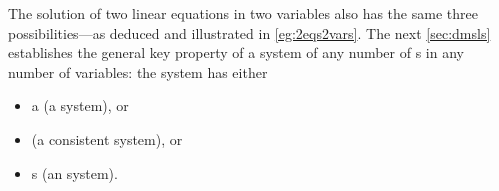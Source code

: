 The solution of two linear equations in two variables also has the same three possibilities---as deduced and illustrated in \autoref{eg:2eqs2vars}.
The next \cref{sec:dmsls} establishes the general key property of a system of any number of s in any number of variables: the system has either
\begin{itemize}
\item a  (a  system), or
\item {} (a consistent system), or
\item {}s (an  system).
\end{itemize}








\sectionExercises



